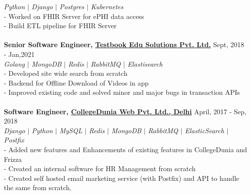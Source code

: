 \documentclass[margin, centered]{res}
\begin{document}
\begin{resume}
\emph{\color{BlueViolet}Python $\vert$ Django $\vert$ Postgres $\vert$ Kubernetes } \\
- Worked on FHIR Server for ePHI data access \\
- Build ETL pipeline for FHIR Server \\
\\
\textbf{Senior Software Engineer, \href{https://testbook.com}{Testbook Edu Solutions Pvt. Ltd.}} \hfill Sept, 2018 - Jan,2021\\
\emph{\color{BlueViolet}Golang $\vert$ MongoDB $\vert$ Redis $\vert$ RabbitMQ $\vert$ Elastisearch} \\
- Developed site wide search from scratch\\
- Backend for Offline Download of Videos in app \\
- Improved existing code and solved minor and major bugs in transaction APIs \\
\\
\textbf{Software Engineer, \href{https://collegedunia.com}{CollegeDunia Web Pvt. Ltd., Delhi}} \hfill April, 2017 - Sep, 2018\\
\emph{\color{BlueViolet}Django $\vert$ Python $\vert$ MySQL $\vert$ Redis $\vert$ MongoDB $\vert$ RabbitMQ $\vert$ ElasticSearch $\vert$ Postfix } \\
- Added new features and Enhancements of existing features in CollegeDunia and Frizza\\
- Created an internal software for HR Management from scratch\\
- Created self hosted email marketing service (with Postfix) and API to handle the same from scratch.\\


\end{resume}
\end{document}
